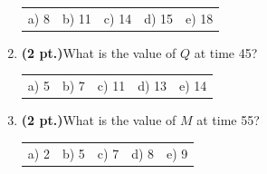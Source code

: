 \documentclass{article}
\begin{document}
\begin{enumerate}
\begin{tabular}{p{0.6in} p{0.6in} p{0.6in} p{0.6in} l}
a) 8  & b) 11  & c) 14 & d) 15  & e) 18
\end{tabular}

\item {\bf (2 pt.)}What is the value of $Q$ at time 45?

\begin{tabular}{p{0.6in} p{0.6in} p{0.6in} p{0.6in} l}
a) 5  & b) 7  & c) 11 & d) 13  & e) 14
\end{tabular}

\item {\bf (2 pt.)}What is the value of $M$ at time 55?

\begin{tabular}{p{0.6in} p{0.6in} p{0.6in} p{0.6in} l}
a) 2  & b) 5  & c) 7 & d) 8  & e) 9
\end{tabular}
\end{enumerate}
\end{document}
